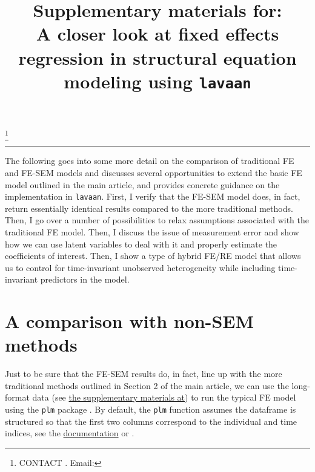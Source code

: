 \documentclass[]{interact}
\theoremstyle{plain}%
\theoremstyle{definition}
\theoremstyle{remark}
\begin{document}
\articletype{}

\title{Supplementary materials for:\\
A closer look at fixed effects regression in structural equation
modeling using \texttt{lavaan}}


\author{
}

\thanks{CONTACT . Email: }

\maketitle



\setcounter{page}{1}

\singlespacing

\doublespacing

\begin{center}\rule{0.5\linewidth}{0.5pt}\end{center}

The following goes into some more detail on the comparison of
traditional FE and FE-SEM models and discusses several opportunities to
extend the basic FE model outlined in the main article, and provides
concrete guidance on the implementation in \texttt{lavaan}. First, I
verify that the FE-SEM model does, in fact, return essentially identical
results compared to the more traditional methods. Then, I go over a
number of possibilities to relax assumptions associated with the
traditional FE model. Then, I discuss the issue of measurement error and
show how we can use latent variables to deal with it and properly
estimate the coefficients of interest. Then, I show a type of hybrid
FE/RE model that allows us to control for time-invariant unobserved
heterogeneity while including time-invariant predictors in the model.

\hypertarget{a-comparison-with-non-sem-methods}{%
\section{A comparison with non-SEM
methods}\label{a-comparison-with-non-sem-methods}}

Just to be sure that the FE-SEM results do, in fact, line up with the
more traditional methods outlined in Section 2 of the main article, we
can use the long-format data (see
\href{https://github.com/henrik-andersen/FE-SEM}{the supplementary
materials at}) to run the typical FE model using the \texttt{plm}
package \citep{R-plm_a}. By default, the \texttt{plm} function assumes
the dataframe is structured so that the first two columns correspond to
the individual and time indices, see the
\href{https://cran.r-project.org/web/packages/plm/plm.pdf}{documentation}
or \citet{R-plm_a}.
\end{document}
